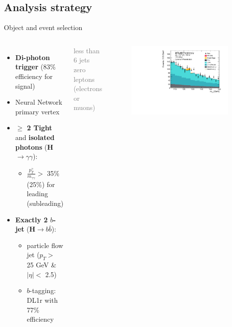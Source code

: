 \subsection{Analysis strategy}

\begin{frame}{Object and event selection}

\begin{columns}

\begin{itemize}
    \item \textbf{Di-photon trigger} (83\% efficiency for signal)
    \item Neural Network primary vertex
    \item \textbf{$\geq $ 2 Tight} and \textbf{isolated} \textbf{photons} (\textbf{\textcolor{HHturquoise_d}{H$\to\gamma\gamma$}}):
    \begin{itemize}
        \item $\frac{p_{T}^{\gamma}}{m_{\gamma\gamma}} > $ 35\% (25\%) for leading (subleading)
    \end{itemize}
    \item \textbf{Exactly 2 $b$-jet} (\textbf{\textcolor{HHred}{H$\to b\bar{b}$}}):
    \begin{itemize}
        \item particle flow jet ($p_{T} > $ 25 GeV \& $|\eta| < $ 2.5)
        \item $b$-tagging: DL1r with 77\% efficiency
    \end{itemize}
\end{itemize}



\textcolor{gray}{less than 6 jets} \\
\textcolor{gray}{zero leptons (electrons or muons)}


\begin{figure}
    \centering
    \includegraphics[width=1.1\textwidth]{Part3/Img/myy_common.pdf}
    

\end{figure}
\end{columns}
\end{frame}
